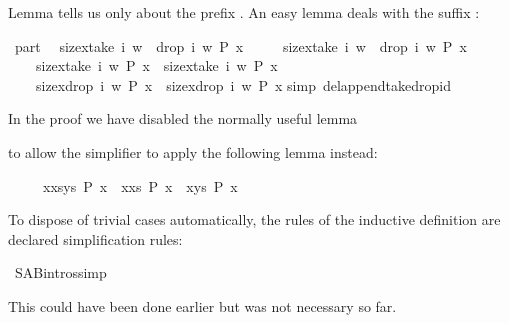 \begin{isabellebody}
\begin{isamarkuptext}
Lemma  tells us only about the prefix .
An easy lemma deals with the suffix :%
\end{isamarkuptext}%
\isamarkuptrue%
\ part{}{\isacharcolon}\isanewline
\ \ {\isachardoublequote}{\isasymlbrakk}size{\isacharbrackleft}x{\isasymin}take\ i\ w\ {\isacharat}\ drop\ i\ w{\isachardot}\ P\ x{\isacharbrackright}\ {\isacharequal}\isanewline
\ \ \ \ size{\isacharbrackleft}x{\isasymin}take\ i\ w\ {\isacharat}\ drop\ i\ w{\isachardot}\ {\isasymnot}P\ x{\isacharbrackright}{\isacharplus}{}{\isacharsemicolon}\isanewline
\ \ \ \ size{\isacharbrackleft}x{\isasymin}take\ i\ w{\isachardot}\ P\ x{\isacharbrackright}\ {\isacharequal}\ size{\isacharbrackleft}x{\isasymin}take\ i\ w{\isachardot}\ {\isasymnot}P\ x{\isacharbrackright}{\isacharplus}{}{\isasymrbrakk}\isanewline
\ \ \ {\isasymLongrightarrow}\ size{\isacharbrackleft}x{\isasymin}drop\ i\ w{\isachardot}\ P\ x{\isacharbrackright}\ {\isacharequal}\ size{\isacharbrackleft}x{\isasymin}drop\ i\ w{\isachardot}\ {\isasymnot}P\ x{\isacharbrackright}{\isacharplus}{}{\isachardoublequote}\isanewline
\isamarkupfalse%
simp\ del{\isacharcolon}append{\isacharunderscore}take{\isacharunderscore}drop{\isacharunderscore}id{\isacharparenright}\isamarkupfalse%
%
\begin{isamarkuptext}%
\noindent
In the proof we have disabled the normally useful lemma
\begin{isabelle}
\end{isabelle}
to allow the simplifier to apply the following lemma instead:
\begin{isabelle}%
\ \ \ \ \ {\isacharbrackleft}x{\isasymin}xs{\isacharat}ys{\isachardot}\ P\ x{\isacharbrackright}\ {\isacharequal}\ {\isacharbrackleft}x{\isasymin}xs{\isachardot}\ P\ x{\isacharbrackright}\ {\isacharat}\ {\isacharbrackleft}x{\isasymin}ys{\isachardot}\ P\ x{\isacharbrackright}%
\end{isabelle}

To dispose of trivial cases automatically, the rules of the inductive
definition are declared simplification rules:%
\end{isamarkuptext}%
\isamarkuptrue%
\ S{\isacharunderscore}A{\isacharunderscore}B{\isachardot}intros{\isacharbrackleft}simp{\isacharbrackright}\isamarkupfalse%
%
\begin{isamarkuptext}%
\noindent
This could have been done earlier but was not necessary so far.


\end{isamarkuptext}
\end{isabellebody}
